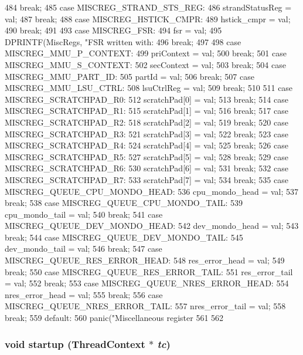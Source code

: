 \begin{DoxyCode}
{{484         break;
485       case MISCREG_STRAND_STS_REG:
486         strandStatusReg = val;
487         break;
488       case MISCREG_HSTICK_CMPR:
489         hstick_cmpr = val;
490         break;
491 
493       case MISCREG_FSR:
494         fsr = val;
495         DPRINTF(MiscRegs, "FSR written with: %
496         break;
497 
498       case MISCREG_MMU_P_CONTEXT:
499         priContext = val;
500         break;
501       case MISCREG_MMU_S_CONTEXT:
502         secContext = val;
503         break;
504       case MISCREG_MMU_PART_ID:
505         partId = val;
506         break;
507       case MISCREG_MMU_LSU_CTRL:
508         lsuCtrlReg = val;
509         break;
510 
511       case MISCREG_SCRATCHPAD_R0:
512         scratchPad[0] = val;
513         break;
514       case MISCREG_SCRATCHPAD_R1:
515         scratchPad[1] = val;
516         break;
517       case MISCREG_SCRATCHPAD_R2:
518         scratchPad[2] = val;
519         break;
520       case MISCREG_SCRATCHPAD_R3:
521         scratchPad[3] = val;
522         break;
523       case MISCREG_SCRATCHPAD_R4:
524         scratchPad[4] = val;
525         break;
526       case MISCREG_SCRATCHPAD_R5:
527         scratchPad[5] = val;
528         break;
529       case MISCREG_SCRATCHPAD_R6:
530         scratchPad[6] = val;
531         break;
532       case MISCREG_SCRATCHPAD_R7:
533         scratchPad[7] = val;
534         break;
535       case MISCREG_QUEUE_CPU_MONDO_HEAD:
536         cpu_mondo_head = val;
537         break;
538       case MISCREG_QUEUE_CPU_MONDO_TAIL:
539         cpu_mondo_tail = val;
540         break;
541       case MISCREG_QUEUE_DEV_MONDO_HEAD:
542         dev_mondo_head = val;
543         break;
544       case MISCREG_QUEUE_DEV_MONDO_TAIL:
545         dev_mondo_tail = val;
546         break;
547       case MISCREG_QUEUE_RES_ERROR_HEAD:
548         res_error_head = val;
549         break;
550       case MISCREG_QUEUE_RES_ERROR_TAIL:
551         res_error_tail = val;
552         break;
553       case MISCREG_QUEUE_NRES_ERROR_HEAD:
554         nres_error_head = val;
555         break;
556       case MISCREG_QUEUE_NRES_ERROR_TAIL:
557         nres_error_tail = val;
558         break;
559       default:
560         panic("Miscellaneous register %
561     }
562 }
\end{DoxyCode}
\hypertarget{classSparcISA_1_1ISA_a769e733729615c529fdb54f538f11dba}{
\subsubsection[{startup}]{\setlength{\rightskip}{0pt plus 5cm}void startup ({\bf ThreadContext} $\ast$ {\em tc})}}
\label{classSparcISA_1_1ISA_a769e733729615c529fdb54f538f11dba}



